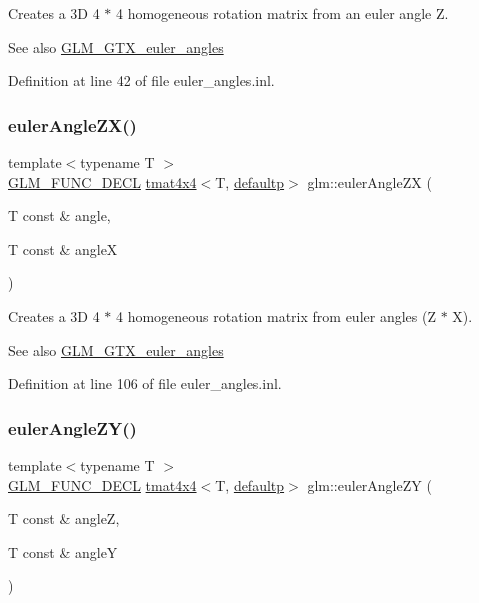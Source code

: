 Creates a 3D 4 $\ast$ 4 homogeneous rotation matrix from an euler angle Z. \begin{DoxySeeAlso}{See also}
\mbox{\hyperlink{group__gtx__euler__angles}{G\+L\+M\+\_\+\+G\+T\+X\+\_\+euler\+\_\+angles}} 
\end{DoxySeeAlso}


Definition at line 42 of file euler\+\_\+angles.\+inl.

\mbox{\label{group__gtx__euler__angles_gaef83cf40bd9ae780011b29970f16f622}} 
\subsubsection{\texorpdfstring{eulerAngleZX()}{eulerAngleZX()}}
{\footnotesize\ttfamily template$<$typename T $>$ \\
\mbox{\hyperlink{setup_8hpp_ab2d052de21a70539923e9bcbf6e83a51}{G\+L\+M\+\_\+\+F\+U\+N\+C\+\_\+\+D\+E\+CL}} \mbox{\hyperlink{structglm_1_1tmat4x4}{tmat4x4}}$<$T, \mbox{\hyperlink{namespaceglm_a0f04f086094c747d227af4425893f545a9d21ccd8b5a009ec7eb7677befc3bf51}{defaultp}}$>$ glm\+::euler\+Angle\+ZX (\begin{DoxyParamCaption}\item[{T const \&}]{angle,  }\item[{T const \&}]{angleX }\end{DoxyParamCaption})}

Creates a 3D 4 $\ast$ 4 homogeneous rotation matrix from euler angles (Z $\ast$ X). \begin{DoxySeeAlso}{See also}
\mbox{\hyperlink{group__gtx__euler__angles}{G\+L\+M\+\_\+\+G\+T\+X\+\_\+euler\+\_\+angles}} 
\end{DoxySeeAlso}


Definition at line 106 of file euler\+\_\+angles.\+inl.

\mbox{\label{group__gtx__euler__angles_ga02f037926568bbd12dfece3b28b20343}} 
\subsubsection{\texorpdfstring{eulerAngleZY()}{eulerAngleZY()}}
{\footnotesize\ttfamily template$<$typename T $>$ \\
\mbox{\hyperlink{setup_8hpp_ab2d052de21a70539923e9bcbf6e83a51}{G\+L\+M\+\_\+\+F\+U\+N\+C\+\_\+\+D\+E\+CL}} \mbox{\hyperlink{structglm_1_1tmat4x4}{tmat4x4}}$<$T, \mbox{\hyperlink{namespaceglm_a0f04f086094c747d227af4425893f545a9d21ccd8b5a009ec7eb7677befc3bf51}{defaultp}}$>$ glm\+::euler\+Angle\+ZY (\begin{DoxyParamCaption}\item[{T const \&}]{angleZ,  }\item[{T const \&}]{angleY }\end{DoxyParamCaption})}

